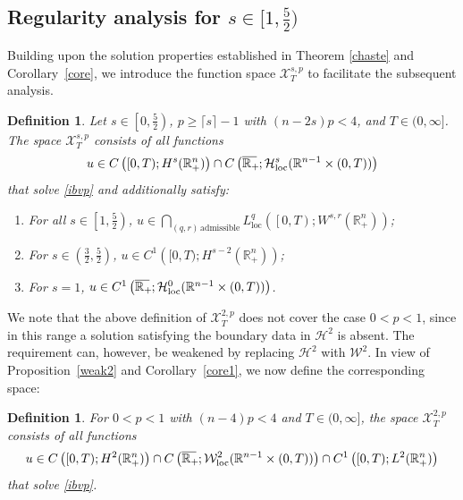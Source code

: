 \documentclass[preprint,compress,12pt]{elsarticle}
\newtheorem{definition}[theorem]{Definition}
\numberwithin{equation}{section}
\begin{document}
\subsection{Regularity analysis for $s\in[1,\frac{5}{2})$}\label{sec42}
Building upon the solution properties established in Theorem \ref{chaste} and Corollary~\ref{core}, we introduce the function space $\mathscr{X}^{s,p}_{T}$ to facilitate the subsequent analysis.
\begin{definition}\label{xspt}
	Let $s\in \left[0,\frac{5}{2}\right)$, $p\geq \lceil s\rceil-1$ with $(n-2s)p<4$, and $T\in (0,\infty]$.
	The space $\mathscr{X}^{s,p}_{T}$ consists of all functions
	\[u\in C\left([0,T);H^{s}(\mathbb{R}^{n}_{+})\right)\cap C\left(\overline{\mathbb{R}_{+}\mkern-4mu}\,;\mathcal{H}^{s}_{\mathrm{loc}}(\mathbb{R}^{n-1}\times(0,T))\right)\] that solve \eqref{ibvp} and additionally satisfy:
	\begin{enumerate}[label=(\arabic*)]
		\item For all $s \in \left[1,\frac{5}{2}\right)$,
		$u \in \bigcap_{(q,r)\, \text{admissible}} L^{q}_{\mathrm{loc}}\left(\left[0,T\right);W^{s,r}(\mathbb{R}^{n}_{+})\right)$;
		\item For $s\in \left(\frac{3}{2},\frac{5}{2}\right)$,  $u\in C^{1}\left([0,T);H^{s-2}(\mathbb{R}^{n}_{+})\right)$;
		\item For $s=1$, $u\in C^{1} \left(\overline{\mathbb{R}_{+}\mkern-4mu}\,; \mathcal{H}^{0}_{\mathrm{loc}}(\mathbb{R}^{n-1}\times(0,T))\right)$.
	\end{enumerate}
\end{definition}
We note that the above definition of $\mathscr{X}^{2,p}_{T}$ does not cover the case $0 < p < 1$, since in this range a solution satisfying the boundary data in $\mathcal{H}^{2}$ is absent. The requirement can, however, be weakened by replacing  $\mathcal{H}^{2}$ with $\mathcal{W}^{2}$.   In view of Proposition~\ref{weak2} and Corollary~\ref{core1}, we now define the corresponding space:
\begin{definition}\label{xspt1}
	For $0 < p < 1$ with $(n-4)p<4$ and $T\in (0,\infty]$,	the space $\mathscr{X}^{2,p}_{T}$ consists of all functions
	\begin{equation*}
		u\in C\left([0,T);H^{2}(\mathbb{R}^{n}_{+})\right)\cap C\left(\overline{\mathbb{R}_{+}\mkern-4mu}\,;\mathcal{W}^{2}_{\mathrm{loc}}(\mathbb{R}^{n-1}\times(0,T))\right)\cap C^{1}\left([0,T);L^{2}(\mathbb{R}^{n}_{+})\right)
	\end{equation*}
	that solve \eqref{ibvp}.
\end{definition}
\end{document}

